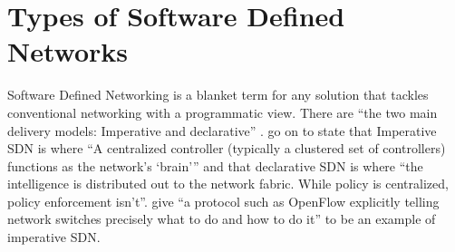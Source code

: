 \section{Types of Software Defined Networks}
\label{litreview:types}

Software Defined Networking is a blanket term for any solution that tackles
conventional networking with a programmatic view. There are ``the two main
delivery models: Imperative and declarative'' \citet{10}. \citet{10} go on to
state that Imperative SDN is
where ``A centralized controller (typically a clustered set of controllers)
functions as the network’s ‘brain’'' and that declarative SDN is where
``the intelligence is distributed out to the network fabric. While policy is
centralized, policy enforcement isn’t''. \citet{10} give ``a protocol such as
OpenFlow explicitly
telling network switches precisely what to do and how to do it'' to be an
example of imperative SDN.